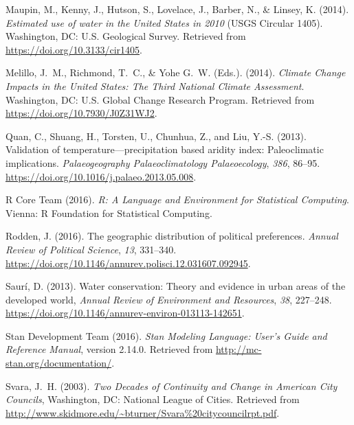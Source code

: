 \documentclass[draft]{agujournal}\usepackage{knitr}
\begin{document}
\begin{thebibliography}{33}
  Maupin, M., Kenny, J., Hutson, S., Lovelace, J., Barber, N., \& Linsey, K. (2014).
  \textit{Estimated use of water in the {U}nited {S}tates in 2010\/}
  (USGS Circular 1405).
  Washington, DC: U.S. Geological Survey.
  Retrieved from
  \url{https://doi.org/10.3133/cir1405}.

  Melillo, J.~M., Richmond, T.~C., \&  Yohe G.~W. (Eds.). (2014).
  \textit{Climate Change Impacts in the {U}nited {S}tates: {T}he Third National Climate
  Assessment}.
  Washington, DC: U.S. Global Change Research Program.
  Retrieved from \url{https://doi.org/10.7930/J0Z31WJ2}.

  Quan, C., Shuang, H., Torsten, U., Chunhua, Z., and Liu, Y.-S. (2013).
  Validation of temperature---precipitation based aridity index: Paleoclimatic
  implications.
  \textit{Palaeogeography Palaeoclimatology Palaeoecology}, \textit{386}, 86--95.
  \url{https://doi.org/10.1016/j.palaeo.2013.05.008}.

  {R Core Team} (2016). \textit{R: A Language and Environment for Statistical
  Computing}.
  Vienna: R Foundation for Statistical Computing.

  Rodden, J. (2016).
  The geographic distribution of political preferences.
  \textit{Annual Review of Political Science}, \textit{13}, 331--340.
  \url{https://doi.org/10.1146/annurev.polisci.12.031607.092945}.

  Saur\'i, D. (2013).
  Water conservation: {T}heory and evidence in urban areas of the developed world,
  \textit{Annual Review of Environment and Resources}, \textit{38}, 227--248.
  \url{https://doi.org/10.1146/annurev-environ-013113-142651}.

  {Stan Development Team} (2016).
  \textit{{S}tan Modeling Language: User's Guide and Reference Manual}, version 2.14.0.
  Retrieved from
  \url{http://mc-stan.org/documentation/}.

  Svara, J.~H. (2003).
  \textit{Two Decades of Continuity and Change in American City Councils},
  Washington, DC: National League of Cities.
  Retrieved from
  \url{http://www.skidmore.edu/~bturner/Svara%20citycouncilrpt.pdf}.


\end{thebibliography}
\end{document}
